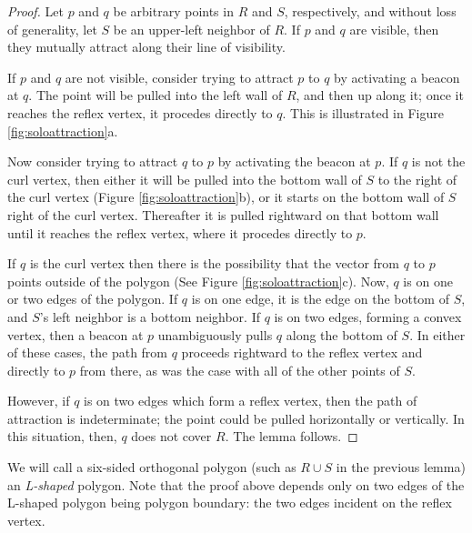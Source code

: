 \documentclass{article}
\begin{document}
	\begin{proof}
		Let $p$ and $q$ be arbitrary points in $R$ and $S$, respectively, and without
		loss of generality, let $S$ be an upper-left neighbor of $R$.
		If $p$ and $q$ are visible, then they mutually attract along their line of
		visibility.
		  
		If $p$ and $q$ are not visible, consider trying to attract $p$ to $q$ by
		activating a beacon at $q$.
		The point will be pulled into the left wall of $R$, and then up along it; once
		it reaches the reflex vertex, it procedes directly to $q$.
		This is illustrated in Figure \ref{fig:soloattraction}a.
		
		Now consider trying to attract $q$ to $p$ by activating the beacon at $p$.
		If $q$ is not the curl vertex, then either it will be pulled into the bottom
		wall of $S$ to the right of the curl vertex (Figure
		\ref{fig:soloattraction}b), or it starts on the bottom wall of $S$ right of
		the curl vertex.  Thereafter it is pulled rightward on that bottom wall until
		it reaches the reflex vertex, where it procedes directly to $p$.
		
		If $q$ is the curl vertex then there is
		the possibility that the vector from $q$ to $p$ points outside of the
		polygon (See Figure \ref{fig:soloattraction}c).  
		Now, $q$ is on one or two edges of the polygon.
		If $q$ is on one edge, it is the edge on the bottom of $S$, and $S$'s left
		neighbor is a bottom neighbor.
		If $q$ is on two edges, forming a convex vertex, then a beacon at $p$
		unambiguously pulls $q$ along the bottom of $S$.
		In either of these cases, the path from $q$ proceeds rightward to
		the reflex vertex and directly to $p$ from there, as was the case with
		all of the other points of $S$.
		
		However, if $q$ is on two edges which form a reflex vertex,
		then the path of attraction is indeterminate; the point could be
		pulled horizontally or vertically.
		In this situation, then, $q$ does not cover $R$.  The lemma follows.
	\end{proof}
	
		We will call a six-sided orthogonal polygon (such as $R \cup S$ in the
		previous lemma) an \emph{L-shaped} polygon.
		Note that the proof above depends only on two edges of the L-shaped polygon
		being polygon boundary: the two edges incident on the reflex vertex.
		
\end{document}
